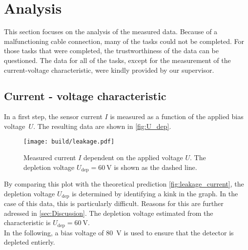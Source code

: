 \section{Analysis}
\label{sec:Analysis}
This section focuses on the analysis of the measured data. Because of a malfunctioning cable connection, many of the tasks could not be completed.
For those tasks that were completed, the trustworthiness of the data can be questioned. 
The data for all of the tasks, except for the measurement of the current-voltage characteristic, were kindly provided by our supervisor.

\subsection{Current - voltage characteristic}
\label{sec:current-voltage characteristic}
In a first step, the sensor current $I$ is measured as a function of the applied bias voltage~$U$. The resulting data are shown in \autoref{fig:U_dep}.
\begin{figure}
    \centering
    \texttt{[image: build/leakage.pdf]}
    \caption{Measured current $I$ dependent on the applied voltage $U$. The depletion voltage $U_{\mathrm{dep}} = \qty{60}{\volt}$ is shown as
    the dashed line.}
    \label{fig:U_dep}
\end{figure}
By comparing this plot with the theoretical prediction \autoref{fig:leakage_current}, the depletion voltage $U_{\mathrm{dep}}$ is determined by identifying a kink
in the graph. In the case of this data, this is particularly difficult. Reasons for this are further adressed in \autoref{sec:Discussion}. The depletion voltage
estimated from the characteristic is $U_\mathrm{dep} = \qty{60}{\volt}$.\\
In the following, a bias voltage of \qty{80}{\volt} is used to ensure that the detector is depleted entierly.

